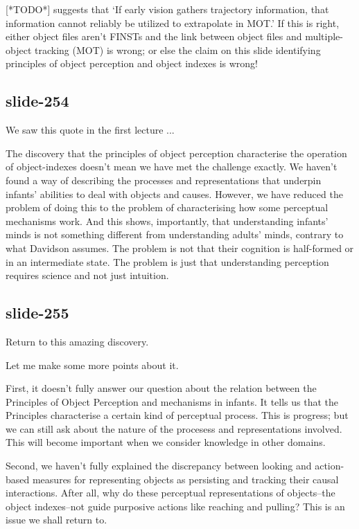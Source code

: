 \documentclass[12pt,\papersize]{extarticle}
\begin{document}
[*TODO*] \citep{keane:2006_motion} suggests that `If early vision gathers trajectory
information, that information cannot reliably be utilized to extrapolate in MOT.'  If this is
right, either object files aren't FINSTs and the link between object files and multiple-object
tracking (MOT) is wrong; or else the claim on this slide identifying principles of object
perception and object indexes is wrong!

\subsection{slide-254}
We saw this quote in the first lecture ...

The discovery that the principles of object perception characterise the operation of
object-indexes doesn't mean we have met the challenge exactly.
We haven't found a way of describing the processes and representations that underpin infants'
abilities to deal with objects and causes.
However, we have reduced the problem of doing this to the problem of characterising how
some perceptual mechanisms work.
And this shows, importantly, that understanding infants' minds is not something different from
understanding adults' minds, contrary to what Davidson assumes.
The problem is not that their cognition is half-formed or in an intermediate state.
The problem is just that understanding perception requires science and not just intuition.

\subsection{slide-255}
Return to this amazing discovery.

Let me make some more points about it.

First, it doesn't fully answer our question about the relation between the Principles of Object
Perception and mechanisms in infants.
It tells us that the Principles characterise a certain kind of perceptual process.
This is progress; but we can still ask about the nature of the procesess and representations
involved.  This will become important when we consider knowledge in other domains.

Second, we haven't fully explained the discrepancy between looking and action-based measures for
representing objects as persisting and tracking their causal interactions.
After all, why do these perceptual representations of objects--the object indexes--not guide
purposive actions like reaching and pulling?
This is an issue we shall return to.
\end{document}
